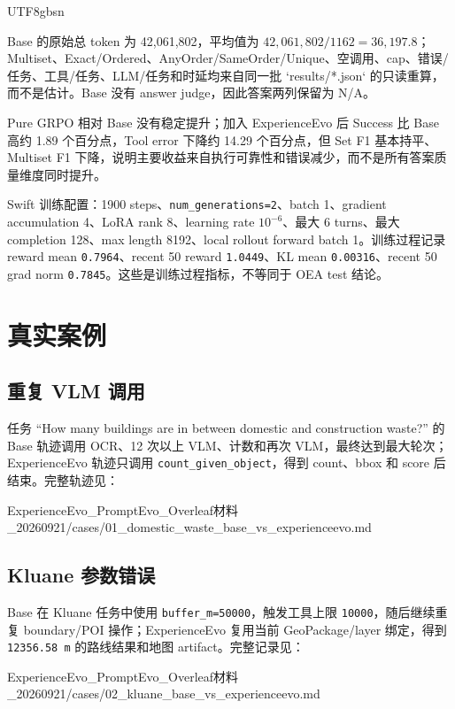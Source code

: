 \documentclass[a4paper,11pt]{article}
\newcommand{\source}[1]{\begingroup\scriptsize\CJKfamily{gbsn}#1\endgroup}
\begin{document}
\begin{CJK*}{UTF8}{gbsn}
\begin{sloppypar}
Base 的原始总 token 为 42,061,802，平均值为 $42{,}061{,}802/1162=36{,}197.8$；Multiset、Exact/Ordered、AnyOrder/SameOrder/Unique、空调用、cap、错误/任务、工具/任务、LLM/任务和时延均来自同一批 `results/*.json` 的只读重算，而不是估计。Base 没有 answer judge，因此答案两列保留为 N/A。
\end{sloppypar}

Pure GRPO 相对 Base 没有稳定提升；加入 ExperienceEvo 后 Success 比 Base 高约 1.89 个百分点，Tool error 下降约 14.29 个百分点，但 Set F1 基本持平、Multiset F1 下降，说明主要收益来自执行可靠性和错误减少，而不是所有答案质量维度同时提升。

Swift 训练配置：1900 steps、\texttt{num\_generations=2}、batch 1、gradient accumulation 4、LoRA rank 8、learning rate $10^{-6}$、最大 6 turns、最大 completion 128、max length 8192、local rollout forward batch 1。训练过程记录 reward mean \texttt{0.7964}、recent 50 reward \texttt{1.0449}、KL mean \texttt{0.00316}、recent 50 grad norm \texttt{0.7845}。这些是训练过程指标，不等同于 OEA test 结论。

\section{真实案例}

\subsection{重复 VLM 调用}

任务 ``How many buildings are in between domestic and construction waste?'' 的 Base 轨迹调用 OCR、12 次以上 VLM、计数和再次 VLM，最终达到最大轮次；ExperienceEvo 轨迹只调用 \texttt{count\_given\_object}，得到 count、bbox 和 score 后结束。完整轨迹见：

\source{ExperienceEvo\_PromptEvo\_Overleaf材料\_20260921/cases/01\_domestic\_waste\_base\_vs\_experienceevo.md}

\subsection{Kluane 参数错误}

Base 在 Kluane 任务中使用 \texttt{buffer\_m=50000}，触发工具上限 \texttt{10000}，随后继续重复 boundary/POI 操作；ExperienceEvo 复用当前 GeoPackage/layer 绑定，得到 \texttt{12356.58 m} 的路线结果和地图 artifact。完整记录见：

\source{ExperienceEvo\_PromptEvo\_Overleaf材料\_20260921/cases/02\_kluane\_base\_vs\_experienceevo.md}


\end{CJK*}
\end{document}
